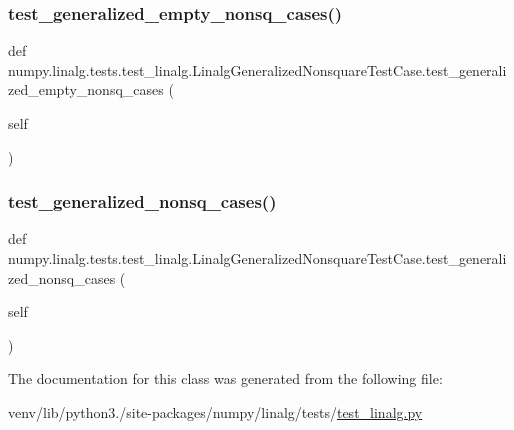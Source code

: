 \subsubsection{\texorpdfstring{test\+\_\+generalized\+\_\+empty\+\_\+nonsq\+\_\+cases()}{test\_generalized\_empty\_nonsq\_cases()}}
{\footnotesize\ttfamily def numpy.\+linalg.\+tests.\+test\+\_\+linalg.\+Linalg\+Generalized\+Nonsquare\+Test\+Case.\+test\+\_\+generalized\+\_\+empty\+\_\+nonsq\+\_\+cases (\begin{DoxyParamCaption}\item[{}]{self }\end{DoxyParamCaption})}

\mbox{\label{classnumpy_1_1linalg_1_1tests_1_1test__linalg_1_1LinalgGeneralizedNonsquareTestCase_aeb55ad01c86f3c96d1aeede8a8446da5}} 
\subsubsection{\texorpdfstring{test\+\_\+generalized\+\_\+nonsq\+\_\+cases()}{test\_generalized\_nonsq\_cases()}}
{\footnotesize\ttfamily def numpy.\+linalg.\+tests.\+test\+\_\+linalg.\+Linalg\+Generalized\+Nonsquare\+Test\+Case.\+test\+\_\+generalized\+\_\+nonsq\+\_\+cases (\begin{DoxyParamCaption}\item[{}]{self }\end{DoxyParamCaption})}



The documentation for this class was generated from the following file\+:\begin{DoxyCompactItemize}
\item 
venv/lib/python3./site-\/packages/numpy/linalg/tests/\hyperlink{test__linalg_8py}{test\+\_\+linalg.\+py}\end{DoxyCompactItemize}
